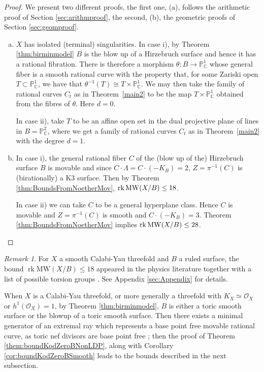 \documentclass[11pt]{amsart}
\theoremstyle{definition}
\theoremstyle{definition}
\theoremstyle{remark}
\newtheorem{remark}[theorem]{Remark}
\theoremstyle{remark}
\theoremstyle{definition}
\theoremstyle{conjecture}
\newcommand{\MW}{\mathrm{MW}}
\begin{document}
\begin{proof} We present two different proofs, the first one, (a),  follows the arithmetic proof of Section \ref{sec:arithmproof}, the second, (b), the geometric proofs of Section  \ref{sec:geomproof}.
\begin{enumerate}[(a)] 
   \item   $X$ has isolated (terminal) singularities. \color{black}  In case i),
{by Theorem \ref{thm:birminmodel} $B$ is the blow up of a Hirzebruch surface and hence it has  a rational fibration.
   There is therefore} a morphism $\theta:B\to {\mathbb P}^1_{\mathbb C}$ whose general fiber is a smooth rational curve with the property that,
for some Zariski open $T\subset {\mathbb P}^1_{\mathbb C}$,
we have that $\theta^{-1}(T)\cong T\times {\mathbb P}^1_{\mathbb C}$.
We may then take the family of rational curves $C_t$ as in Theorem~\ref{main2}
to be the map $T\times{\mathbb P}^1_{\mathbb C}$
obtained from the fibres of $\theta$. Here $d=0$.

In case ii), take $T$ to be an affine open set
in the dual projective plane of lines in $B={\mathbb P}^2_{\mathbb C}$,
where we get a family of rational curves $C_t$ as in Theorem~\ref{main2} with the degree $d=1$.
     \item 
{In case i), 
 the general rational fiber $C$ of the (blow up of the) Hirzebruch surface $B$} is movable and since $C\cdot \Lambda = C \cdot (-K_B) =2$, $Z = \pi^{-1}(C)$ is (birationally) a K3 surface. Then by Theorem \ref{thm:BoundsFromNoetherMov}, ${\rm rk}\, \MW(X/B)\leq 18$. 

{In case ii)} we can take $C$ to be 
a general hyperplane class. Hence $C$ is movable and $Z = \pi^{-1}(C)$ is smooth and 
 $C \cdot (-K_B) =3$. Theorem \ref{thm:BoundsFromNoetherMov}  implies ${\rm rk }\, \MW(X/B)\leq 28$. 
\end{enumerate} \end{proof}


 \begin{remark}\label{remark:CY}
For $X$ a smooth  Calabi-Yau threefold and $B$ a ruled surface, the  bound 
$\operatorname{rk} \MW(X/B) \leq 18$
appeared in the physics literature  together  with a list of  possible torsion groups \cite{Lee:2022swr} \cite{HajoujiOehlmann}. See Appendix \ref{sec:Appendix} for details.
     \color{black}
 \end{remark}
 

 When $X$ is a Calabi-Yau threefold, or more generally a threefold with $K_X \simeq \mathcal{O}_X$ or $h^1(\mathcal{O}_X)=1$,  by  Theorem \ref{thm:birminmodel},  $B$ is either a toric smooth surface or the blowup of a toric smooth surface.    Then there  exists a minimal generator  of an extremal ray which represents a base point free movable  rational curve, as  toric nef divisors are base point free \cite[Theorem 1.6]{Mavlyutov2000}; then the proof of Theorem \ref{them:boundKodZeroBNonLDP}, along with Corollary \ref{cor:boundKodZeroBSmooth} leads to the bounds described in the next subsection.
\end{document}
